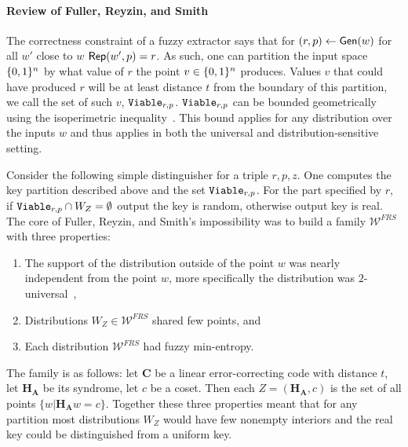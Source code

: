 \paragraph{Review of Fuller, Reyzin, and Smith~\cite{fuller2020fuzzy}}
The correctness constraint of a fuzzy extractor says that for $(r, p)\leftarrow {\ensuremath{\mathsf{Gen}}}(w)$ for all $w'$ close to $w$ ${\mathsf{Rep}}(w', p)=r$.  As such, one can partition the input space $\{0, 1\}^n$ by what value of $r$ the point  $v\in \{0, 1\}^n$ produces.  Values $v$ that could have produced  $r$ will be at least distance $t$ from the boundary of this partition, we call the set of such $v$, $\mathtt{Viable}_{r,p}$.  $\mathtt{Viable}_{r,p}$ can be bounded geometrically using the isoperimetric inequality~\cite{harper1966optimal}.  This bound applies for any distribution over the inputs $w$ and thus applies in  both the universal and distribution-sensitive setting.

Consider the following simple distinguisher for a triple $r, p, z$.  One computes the key partition described above and the set $\mathtt{Viable}_{r,p}$. For the part specified by $r$, if $\mathtt{Viable}_{r,p} \cap W_Z =\emptyset$ output the key is random, otherwise output key is real.
The core of Fuller, Reyzin, and Smith's impossibility was to build a family $\mathcal{W}^{FRS}$ with three properties:
\begin{enumerate}
\item The support of the distribution outside of the point $w$ was nearly independent from the point $w$, more specifically the distribution was $2$-universal~\cite{carter1977universal}, 
\item Distributions $W_Z \in \mathcal{W}^{FRS}$ shared few points, and 
\item Each distribution $\mathcal{W}^{FRS}$ had fuzzy min-entropy.
\end{enumerate}
The family is as follows: let $\mathbf{C}$ be a linear error-correcting code with distance $t$, let $\mathbf{H}_{\mathbf{A}}$ be its syndrome, let $c$ be a coset.  Then each $Z = (\mathbf{H}_{\mathbf{A}}, c)$ is the set of all points $\{w | \mathbf{H}_{\mathbf{A}} w = c\}$.
Together these three properties meant that for any partition most distributions $W_Z$ would have few nonempty interiors and the real key could be distinguished from a uniform key.  

